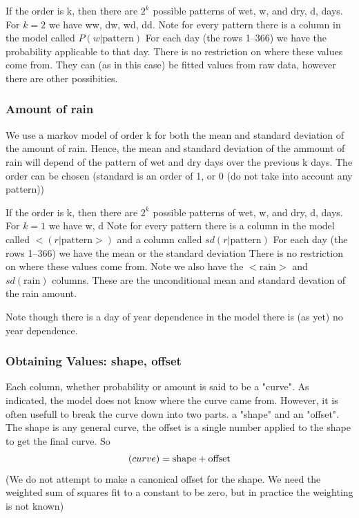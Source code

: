 \documentclass{article}
\begin{document}
If the order is k, then there are $2^k$ possible patterns of
wet, w, and dry, d,  days.  For $k=2$ we have ww, dw, wd, dd.  Note for
every pattern there is a column in the model called $P(w|\mbox{pattern})$
For each day (the rows 1--366) we have the probability applicable to that
day.  There is no restriction on where these values come from. They can
(as in this case) be fitted values from raw data, however there are other
possibities.

\subsubsection{Amount of rain}

We use a markov model of order k for both the mean and standard deviation
of the amount of rain.  Hence, the mean and standard deviation of the ammount
of rain
will depend of the pattern of wet and dry days over the previous
k days.  The order can be chosen (standard is an order of 1, or 0
(do not take into account any pattern))

If the order is k, then there are $2^k$ possible patterns of
wet, w, and dry, d,  days.  For $k=1$ we have w, d  Note for
every pattern there is a column in the model called $<(r|\mbox{pattern}>)$
and a column called $sd(r|\mbox{pattern})$
For each day (the rows 1--366) we have the mean or the standard deviation
There is no restriction on where these values come from.
Note we also have the $<\mbox{rain}>$ and $sd(\mbox{rain})$ columns.
These are the unconditional mean and standard devation of the rain
amount.

Note though there is a day of year dependence in the
model there is (as yet) no year dependence.

\subsubsection{Obtaining Values: shape, offset}


Each column, whether probability or amount is said to be a "curve".
As indicated, the model does not know where the curve came
from.  However, it is often usefull to break the curve down
into two parts.  a "shape" and an "offset".   The shape is
any general curve, the offset is a single number applied to the shape
to get the final curve.  So
\begin{equation}
\mbox(curve) = \mbox{shape} + \mbox{offset}
\end{equation}
(We do not attempt to make a canonical offset for the shape.
We need the weighted sum of squares fit to a constant to be zero,
but in practice the weighting is not known)
\end{document}
